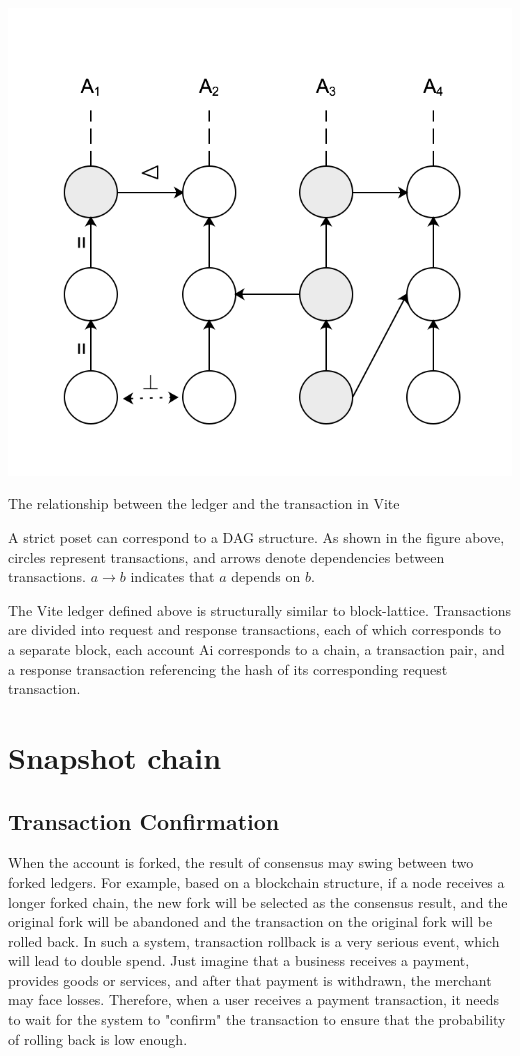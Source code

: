 \documentclass[UTF8,nofonts]{article}
\makeatletter
\newenvironment{figurehere}
 {\def\@captype{figure}}
 {}
\makeatother
\begin{document}
\begin{multicols}{2}
\begin{center}
\begin{figurehere}
\includegraphics[width=.7\linewidth]{image/ledger.png}
\caption{The relationship between the ledger and the transaction in Vite}
\end{figurehere}
\end{center}

A strict poset can correspond to a DAG structure. As shown in the figure above, circles represent transactions, and arrows denote dependencies between transactions. $a \rightarrow b$ indicates that $a$ depends on $b$.

The Vite ledger defined above is structurally similar to block-lattice. Transactions are divided into request and response transactions, each of which corresponds to a separate block, each account Ai corresponds to a chain, a transaction pair, and a response transaction referencing the hash of its corresponding request transaction.


\section{Snapshot chain}
\subsection{Transaction Confirmation}
When the account is forked, the result of consensus may swing between two forked ledgers. For example, based on a blockchain structure, if a node receives a longer forked chain, the new fork will be selected as the consensus result, and the original fork will be abandoned and the transaction on the original fork will be rolled back. In such a system, transaction rollback is a very serious event, which will lead to double spend. Just imagine that a business receives a payment, provides goods or services, and after that payment is withdrawn, the merchant may face losses. Therefore, when a user receives a payment transaction, it needs to wait for the system to "confirm" the transaction to ensure that the probability of rolling back is low enough.


\end{multicols}
\end{document}
